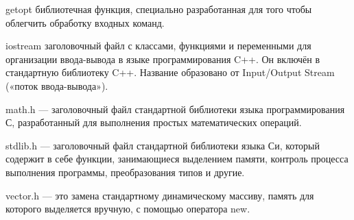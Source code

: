 getopt библиотечная функция, специально разработанная для того чтобы облегчить обработку входных команд. 

iostream заголовочный файл с классами, функциями и переменными для организации ввода-вывода в языке программирования C++. Он включён в стандартную библиотеку C++. Название образовано от Input/Output Stream («поток ввода-вывода»).

math.h — заголовочный файл стандартной библиотеки языка программирования С, разработанный для выполнения простых математических операций.

stdlib.h — заголовочный файл стандартной библиотеки языка Си, который содержит в себе функции, занимающиеся выделением памяти, контроль процесса выполнения программы, преобразования типов и другие.

vector.h — это замена стандартному динамическому массиву, память для которого выделяется вручную, с помощью оператора new.